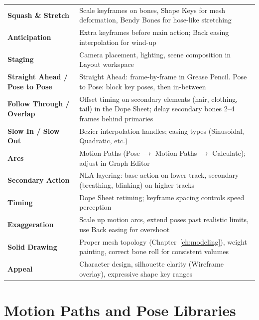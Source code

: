 \begin{center}
\begin{tabularx}{\textwidth}{L{3.5cm}X}
\toprule
{}
 &  \\
\midrule
\textbf{Squash \& Stretch} & Scale keyframes on bones, Shape Keys for mesh deformation, Bendy Bones for hose-like stretching \\
\textbf{Anticipation} & Extra keyframes before main action; Back easing interpolation for wind-up \\
\textbf{Staging} & Camera placement, lighting, scene composition in Layout workspace \\
\textbf{Straight Ahead / Pose to Pose} & Straight Ahead: frame-by-frame in Grease Pencil. Pose to Pose: block key poses, then in-between \\
\textbf{Follow Through / Overlap} & Offset timing on secondary elements (hair, clothing, tail) in the Dope Sheet; delay secondary bones 2--4 frames behind primaries \\
\textbf{Slow In / Slow Out} & Bezier interpolation handles; easing types (Sinusoidal, Quadratic, etc.) \\
\textbf{Arcs} & Motion Paths (Pose $\rightarrow$ Motion Paths $\rightarrow$ Calculate); adjust in Graph Editor \\
\textbf{Secondary Action} & NLA layering: base action on lower track, secondary (breathing, blinking) on higher tracks \\
\textbf{Timing} & Dope Sheet retiming; keyframe spacing controls speed perception \\
\textbf{Exaggeration} & Scale up motion arcs, extend poses past realistic limits, use Back easing for overshoot \\
\textbf{Solid Drawing} & Proper mesh topology (Chapter~\ref{ch:modeling}), weight painting, correct bone roll for consistent volumes \\
\textbf{Appeal} & Character design, silhouette clarity (Wireframe overlay), expressive shape key ranges \\
\bottomrule
\end{tabularx}
\end{center}


\section{Motion Paths and Pose Libraries}
\label{sec:motion-paths}

